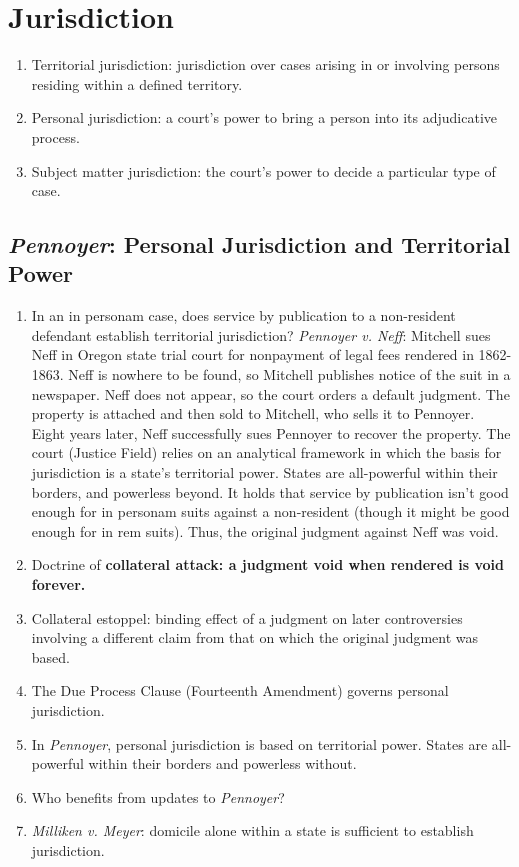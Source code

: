 \section{Jurisdiction}

\begin{enumerate}
    \item Territorial jurisdiction: jurisdiction over cases arising in or involving persons residing within a defined territory.
    \item Personal jurisdiction: a court's power to bring a person into its adjudicative process.
    \item Subject matter jurisdiction: the court's power to decide a particular type of case.
\end{enumerate}

\subsection{\emph{Pennoyer}: Personal Jurisdiction and Territorial Power}

\begin{enumerate}
    \item  In an in personam case, does service by publication to a non-resident defendant establish territorial jurisdiction? \emph{Pennoyer v. Neff}:
Mitchell sues Neff in Oregon state trial court for nonpayment of legal fees rendered in 1862-1863. Neff is nowhere to be found, so Mitchell publishes notice of the suit in a newspaper. Neff does not appear, so the court orders a default judgment. The property is attached and then sold to Mitchell, who sells it to Pennoyer. Eight years later, Neff successfully sues Pennoyer to recover the property. The court (Justice Field) relies on an analytical framework in which the basis for jurisdiction is a state's territorial power. States are all-powerful within their borders, and powerless beyond. It holds that service by publication isn't good enough for in personam suits against a non-resident (though it might be good enough for in rem suits). Thus, the original judgment against Neff was void.
    \item Doctrine of \textbf{collateral attack: a judgment void when rendered is void forever.}
    \item Collateral estoppel: binding effect of a judgment on later controversies involving a different claim from that on which the original judgment was based.
    \item The Due Process Clause (Fourteenth Amendment) governs personal jurisdiction.
    \item In \emph{Pennoyer}, personal jurisdiction is based on territorial power. States are all-powerful within their borders and powerless without.
    \item Who benefits from updates to \emph{Pennoyer}?
    \item \emph{Milliken v. Meyer}: domicile alone within a state is sufficient to establish jurisdiction.
\end{enumerate}

